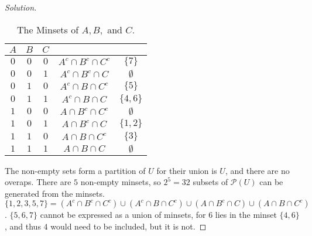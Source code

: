 \documentclass[../main.tex]{subfiles}
\begin{document}
\begin{proof}[Solution]
%
\begin{table}[H]
    \centering
    \begin{tabular}{c c c c c}
        \hline
        $A$ & $B$ & $C$ & &  \\ [0.5ex] 
        \hline
        $0$ & $0$ & $0$ & $A^c\cap B^c\cap C^c$ & $\{7\}$\\
        $0$ & $0$ & $1$ & $A^c\cap B^c\cap C$ & $\emptyset$\\
        $0$ & $1$ & $0$ & $A^c\cap B\cap C^c$ & $\{5\}$\\
        $0$ & $1$ & $1$ & $A^c\cap B \cap C$ & $\{4,6\}$\\
        $1$ & $0$ & $0$ & $A\cap B^c\cap C^c$ & $\emptyset$\\
        $1$ & $0$ & $1$ & $A\cap B^c\cap C$ & $\{1,2\}$\\
        $1$ & $1$ & $0$ & $A\cap B\cap C^c$ & $\{3\}$\\
        $1$ & $1$ & $1$ & $A\cap B \cap C$ & $\emptyset$\\
        \hline
    \end{tabular}
    \caption{The Minsets of $A,B,$ and $C$.}
    \label{tab:discrete_structures_practice_exam_III_Problem_1}
\end{table}
%
The non-empty sets form a partition of $U$ for their union is $U$, and there are no overaps. There are $5$ non-empty minsets, so $2^{5} = 32$ subsets of $\mathcal{P}(U)$ can be generated from the minsets. $\{1,2,3,5,7\} = (A^c\cap B^c \cap C^c)\cup (A^c\cap B\cap C^c)\cup (A\cap B^c\cap C)\cup (A\cap B\cap C^c)$. $\{5,6,7\}$ cannot be expressed as a union of minsets, for $6$ lies in the minset $\{4,6\}$, and thus $4$ would need to be included, but it is not.
\end{proof}
\end{document}
